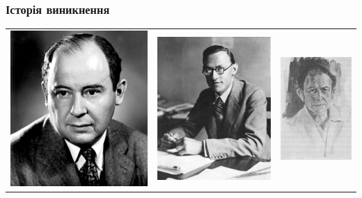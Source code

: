 \documentclass[10pt,pdf,aspectratio=169]{beamer}
\begin{document}
    \begin{frame}
        \frametitle{Історія виникнення}
        \begin{center}
            \begin{tabular}{c c c}
                \includegraphics[scale=0.275]{../pics/John_von_Neumann.jpg} &
                \includegraphics[scale=0.4]{../pics/Oskar_Morgenstern.jpg} &
                \includegraphics[scale=0.42]{../pics/Rufus_Isaacs.jpg} \\

\end{tabular}
\end{center}
\end{frame}
\end{document}

